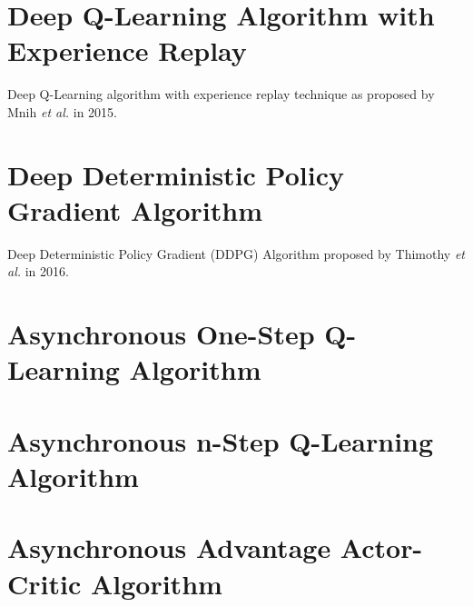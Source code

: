 \documentclass[a4paper,oneside,12pt]{report}
\begin{document}
\begin{appendices}
\chapter{Deep Q-Learning Algorithm with Experience Replay}

Deep Q-Learning algorithm with experience replay technique as proposed by Mnih \textit{et al.} in 2015.

\chapter{Deep Deterministic Policy Gradient Algorithm}

Deep Deterministic Policy Gradient (DDPG) Algorithm proposed by Thimothy \textit{et al.} in 2016.

\chapter{Asynchronous One-Step Q-Learning Algorithm}

\chapter{Asynchronous n-Step Q-Learning Algorithm}

\chapter{Asynchronous Advantage Actor-Critic Algorithm}

\end{appendices}
\end{document}
